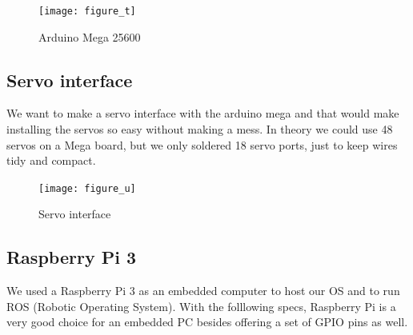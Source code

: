 \begin{figure}[H]
	\centering
	\texttt{[image: figure\_t]}
	\caption{Arduino Mega 25600}
	\label{figure_t}
\end{figure}

\subsection{Servo interface}
We want to make a servo interface with the arduino mega and that would make installing the servos so easy without making a mess. In theory we could use 48 servos on a Mega board, but we only soldered 18 servo ports, just to keep wires tidy and compact.

\begin{figure}[H]
	\centering
	\texttt{[image: figure\_u]}
	\caption{Servo interface}
	\label{figure_u}
\end{figure}

\subsection{Raspberry Pi 3}
We used a Raspberry Pi 3 as an embedded computer to host our OS and to run ROS (Robotic Operating System). With the folllowing specs, Raspberry Pi is a very good choice for an embedded PC besides offering a set of GPIO pins as well.

